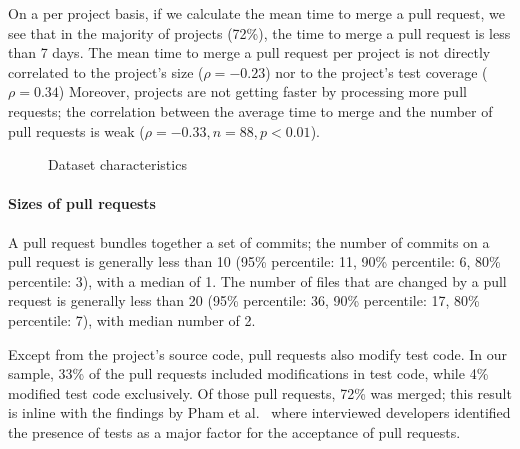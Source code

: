 \documentclass{sig-alternate}
\begin{document}
On a per project basis, if we calculate the mean time to merge a pull request,
we see that in the majority of projects (72\%), the time to merge a pull
request is less than 7 days. The mean time to merge a pull request per project
is not directly correlated to the project's size ($\rho = -0.23$) nor to the
project's test coverage ($\rho = 0.34$) Moreover, projects are not getting
faster by processing more pull requests; the correlation between the average
time to merge and the number of pull requests is weak ($\rho = -0.33, n =
88, p < 0.01$).

\begin{figure*}
\centering
{}
\caption{Dataset characteristics}
\end{figure*}

\paragraph*{Sizes of pull requests}

A pull request bundles together a set of commits; the number of 
commits on a pull request is generally less than 10 (95\% percentile: 11,
90\% percentile: 6, 80\% percentile: 3), with a median of 1. The number of 
files that are changed by a pull request is generally less than 20 
(95\% percentile: 36, 90\% percentile: 17, 80\% percentile: 7), with 
median number of 2. 

Except from the project's source code, pull requests also modify test
code. In our sample, 33\% of the pull requests included modifications
in test code, while 4\% modified test code exclusively. Of those
pull requests, 72\% was merged; this result is inline with the findings by
Pham et al.~\cite{Pham13} where interviewed developers identified 
the presence of tests as a major factor for the acceptance of pull requests.
\end{document}
